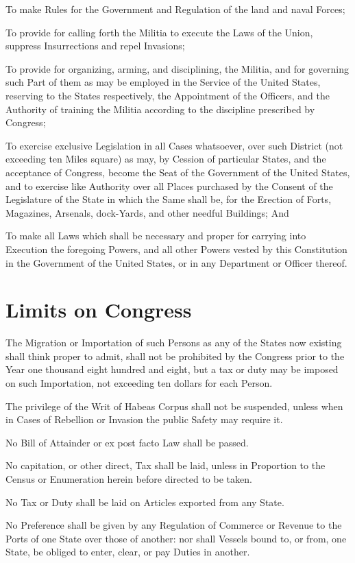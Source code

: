 \documentclass{constitution}
\begin{document}
To make Rules for the Government and Regulation of the land and naval Forces;

To provide for calling forth the Militia to execute the Laws of the Union,
suppress Insurrections and repel Invasions;

To provide for organizing, arming, and disciplining, the Militia,
and for governing such Part of them as may be employed in the Service of the United States,
reserving to the States respectively, the Appointment of the Officers,
and the Authority of training the Militia according to the discipline prescribed by Congress;

To exercise exclusive Legislation in all Cases whatsoever,
over such District (not exceeding ten Miles square) as may,
by Cession of particular States, and the acceptance of Congress,
become the Seat of the Government of the United States,
and to exercise like Authority over all Places
purchased by the Consent of the Legislature of the State in which the Same shall be,
for the Erection of Forts, Magazines, Arsenals, dock-Yards, and other needful Buildings; And

To make all Laws which shall be necessary and proper
for carrying into Execution the foregoing Powers,
and all other Powers vested by this Constitution in the Government of the United States,
or in any Department or Officer thereof.

\section{Limits on Congress}
The Migration or Importation of such Persons
as any of the States now existing shall think proper to admit,
shall not be prohibited by the Congress prior to the Year one thousand eight hundred and eight,
but a tax or duty may be imposed on such Importation,
not exceeding ten dollars for each Person.

The privilege of the Writ of Habeas Corpus shall not be suspended,
unless when in Cases of Rebellion or Invasion the public Safety may require it.

No Bill of Attainder or ex post facto Law shall be passed.

No capitation, or other direct, Tax shall be laid,
unless in Proportion to the Census or Enumeration herein before directed to be taken.

No Tax or Duty shall be laid on Articles exported from any State.

No Preference shall be given by any Regulation of Commerce or Revenue
to the Ports of one State over those of another:
nor shall Vessels bound to, or from, one State,
be obliged to enter, clear, or pay Duties in another.
\end{document}
